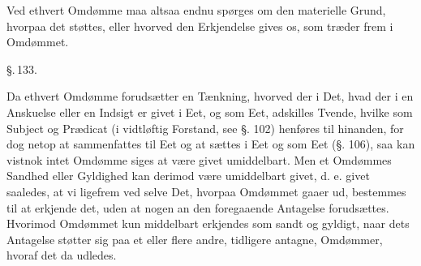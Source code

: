 \documentclass[12pt]{book}
\def\textit#1{#1}%
\def\emph#1{#1}%
\newcommand{\parag}[1]{%
  \par\vspace{0.9\baselineskip}%
  {\centering\textit{\S.\,#1.}\par}%
  \vspace{0.35\baselineskip}%
  \noindent\hspace{\parindent}\ignorespaces
}
\newcommand{\opage}[1]{\marginnote{\footnotesize\textit{[#1]}}}
\begin{document}
Ved ethvert Omdømme maa altsaa endnu spørges om den materielle Grund, hvorpaa
det støttes, eller hvorved den Erkjendelse gives os, som træder frem i
Omdømmet.

\parag{133}

Da ethvert Omdømme forudsætter en Tænkning, hvorved der i Det, hvad der i en
Anskuelse eller en Indsigt er givet i Eet, og som Eet, adskilles Tvende, hvilke
som Subject og Prædicat (i vidtløftig Forstand, see §. 102) henføres til
hinanden, for dog netop at sammenfattes til Eet og at sættes i Eet og som Eet
(§. 106), saa kan vistnok intet Omdømme siges at være givet umiddelbart. Men et
Omdømmes Sandhed eller Gyldighed kan derimod være umiddelbart givet, d. e.
givet saaledes, at vi ligefrem ved selve Det, hvorpaa Omdømmet gaaer ud,
bestemmes til at erkjende det, \emph{uden at nogen an%
\opage{319}den foregaaende Antagelse} forudsættes. Hvorimod Omdømmet kun middelbart
erkjendes som sandt og gyldigt, naar dets Antagelse støtter sig paa et eller
flere andre, tidligere antagne, Omdømmer, hvoraf det da udledes.
\end{document}
